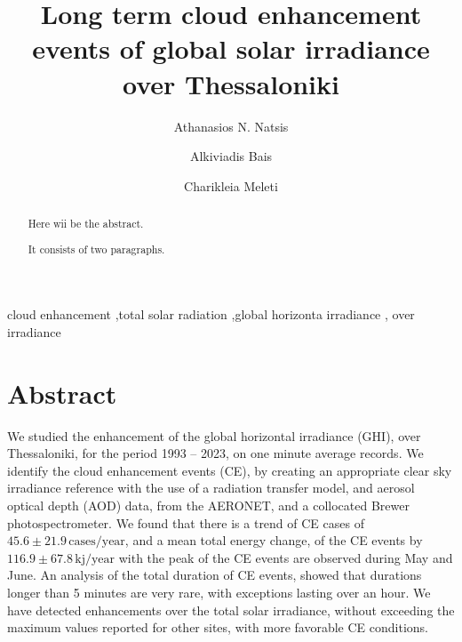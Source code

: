 \documentclass[preprint, 3p,
authoryear]{elsarticle} %
\begin{document}
\begin{frontmatter}

  \title{Long term cloud enhancement events of global solar irradiance
over Thessaloniki}
    \author[LAP]{Athanasios N. Natsis%
  }
    \author[LAP]{Alkiviadis Bais%
  }
    \author[LAP]{Charikleia Meleti%
  }
  
  \begin{abstract}
  Here wii be the abstract.

  It consists of two paragraphs.
  \end{abstract}
    \begin{keyword}
    cloud enhancement \sep total solar radiation \sep global horizonta
irradiance \sep 
    over irradiance
  \end{keyword}
  
 \end{frontmatter}

\hypertarget{abstract}{%
\section*{Abstract}\label{abstract}}

We studied the enhancement of the global horizontal irradiance (GHI),
over Thessaloniki, for the period 1993 -- 2023, on one minute average
records. We identify the cloud enhancement events (CE), by creating an
appropriate clear sky irradiance reference with the use of a radiation
transfer model, and aerosol optical depth (AOD) data, from the AERONET,
and a collocated Brewer photospectrometer. We found that there is a
trend of CE cases of \(45.6\pm 21.9\,\text{cases}/\text{year}\), and a
mean total energy change, of the CE events by
\(116.9\pm 67.8\,\text{kj}/\text{year}\) with the peak of the CE events
are observed during May and June. An analysis of the total duration of
CE events, showed that durations longer than 5 minutes are very rare,
with exceptions lasting over an hour. We have detected enhancements over
the total solar irradiance, without exceeding the maximum values
reported for other sites, with more favorable CE conditions.
\end{document}
